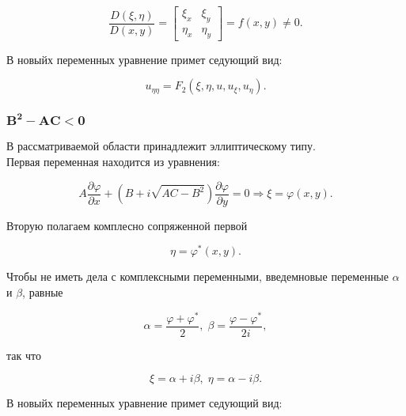 			\begin{equation}
				\frac{D \left( \xi, \eta \right)}{D \left( x, y \right)} =
				\begin{bmatrix}
					\xi_{x} & \xi_{y}\\
					\eta_{x} & \eta_{y}
				\end{bmatrix} =
				f \left( x, y \right) \neq 0.
			\end{equation}

			В новыйх переменных уравнение примет седующий вид:
			
			\begin{equation}
				u_{\eta \eta} = F_{2} \left( \xi, \eta, u, u_{\xi}, u_{\eta} \right).
			\end{equation}

		\subsubsection*{$\mathbf{B^{2} - AC < 0}$}

			В рассматриваемой области принадлежит эллиптическому типу.\\

			Первая переменная находится из уравнения:

		    \begin{equation}
				A \frac{\partial \varphi}{\partial x} + \left( B + i \sqrt{A C - B^{2}} \right) \frac{\partial \varphi}{\partial y} = 0 \Rightarrow \xi = \varphi \left( x, y \right).
			\end{equation}

			Вторую полагаем комплесно сопряженной первой

			\begin{equation}
				\eta = \varphi^{*} \left( x, y \right).
			\end{equation}

			 Чтобы не иметь дела с комплексными переменными, введемновые переменные $\alpha$ и $\beta$, равные

			\begin{equation}
				\alpha = \frac{\varphi + \varphi^{*}}{2}, \; \beta = \frac{\varphi - \varphi^{*}}{2 i},
			\end{equation}

			так что

			\begin{equation}
				\xi = \alpha + i \beta, \; \eta = \alpha - i \beta.
			\end{equation}

			В новыйх переменных уравнение примет седующий вид:

